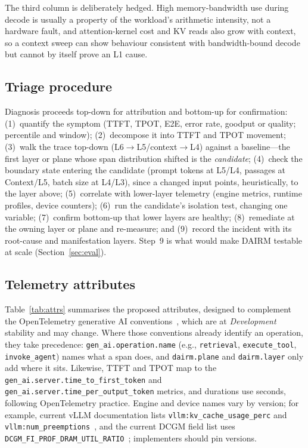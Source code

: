 \documentclass[11pt]{article}
\begin{document}
The third column is deliberately hedged. High memory-bandwidth use during decode is usually a property of the workload's arithmetic intensity, not a hardware fault, and attention-kernel cost and KV reads also grow with context, so a context sweep can show behaviour consistent with bandwidth-bound decode but cannot by itself prove an L1 cause.

\subsection{Triage procedure}
\label{sec:triage}
Diagnosis proceeds top-down for attribution and bottom-up for confirmation: (1)~quantify the symptom (TTFT, TPOT, E2E, error rate, goodput or quality; percentile and window); (2)~decompose it into TTFT and TPOT movement; (3)~walk the trace top-down (L6$\rightarrow$L5/context$\rightarrow$L4) against a baseline---the first layer or plane whose span distribution shifted is the \emph{candidate}; (4)~check the boundary state entering the candidate (prompt tokens at L5/L4, passages at Context/L5, batch size at L4/L3), since a changed input points, heuristically, to the layer above; (5)~correlate with lower-layer telemetry (engine metrics, runtime profiles, device counters); (6)~run the candidate's isolation test, changing one variable; (7)~confirm bottom-up that lower layers are healthy; (8)~remediate at the owning layer or plane and re-measure; and (9)~record the incident with its root-cause and manifestation layers. Step~9 is what would make DAIRM testable at scale (Section~\ref{sec:eval}).

\subsection{Telemetry attributes}
\label{sec:telemetry}
Table~\ref{tab:attrs} summarises the proposed attributes, designed to complement the OpenTelemetry generative AI conventions~\cite{otelgenai}, which are at \emph{Development} stability and may change. Where those conventions already identify an operation, they take precedence: \texttt{gen\_ai.operation.name} (e.g., \texttt{retrieval}, \texttt{execute\_tool}, \texttt{invoke\_agent}) names what a span does, and \texttt{dairm.plane} and \texttt{dairm.layer} only add where it sits. Likewise, TTFT and TPOT map to the \texttt{gen\_ai.server.time\_to\_first\_token} and \texttt{gen\_ai.server.time\_per\_output\_token} metrics, and durations use seconds, following OpenTelemetry practice. Engine and device names vary by version; for example, current vLLM documentation lists \texttt{vllm:kv\_cache\_usage\_perc} and \texttt{vllm:num\_preemptions}~\cite{vllmmetrics}, and the current DCGM field list uses \texttt{DCGM\_FI\_PROF\_DRAM\_UTIL\_RATIO}~\cite{dcgmfields}; implementers should pin versions.
\end{document}
